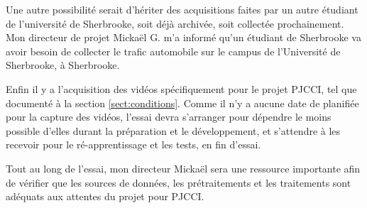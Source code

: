 \par Une autre possibilité serait d'hériter des acquisitions faites par un autre étudiant de l'université de Sherbrooke, soit déjà archivée, soit collectée prochainement. Mon directeur de projet Mickaël G. m'a informé qu'un étudiant de Sherbrooke va avoir besoin de collecter le trafic automobile sur le campus de l'Université de Sherbrooke, à Sherbrooke. 
\par Enfin il y a l'acquisition des vidéos spécifiquement pour le projet PJCCI, tel que documenté à la section \ref{sect:conditions}. Comme il n'y a aucune date de planifiée pour la capture des vidéos, l'essai devra s'arranger pour dépendre le moins possible d'elles durant la préparation et le développement, et s'attendre à les recevoir pour le ré-apprentissage et les tests, en fin d'essai.
\par Tout au long de l'essai, mon directeur Mickaël sera une ressource importante afin de vérifier que les sources de données, les prétraitements et les traitements sont adéquats aux attentes du projet pour PJCCI.
